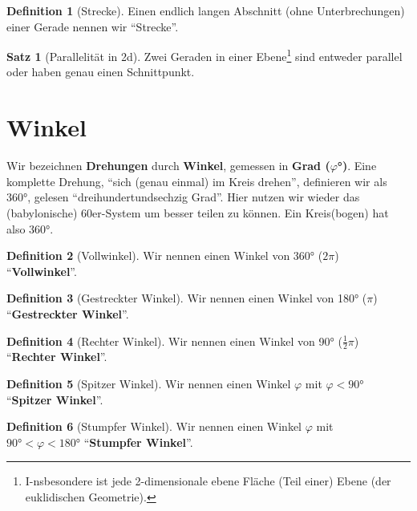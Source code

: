 \documentclass[a4paper]{book}%
\theoremstyle{definition}
\newtheorem{definition}{Definition}
\newtheorem{satz}{Satz}
\begin{document}
\begin{definition}[Strecke]\label{def:Strecke}
    Einen endlich langen Abschnitt (ohne Unterbrechungen) einer Gerade nennen wir \enquote{Strecke}.
\end{definition}

\begin{satz}[Parallelität in 2d]\label{def:Parallele}
    Zwei Geraden in einer Ebene\footnote{I-nsbesondere ist jede 2-dimensionale ebene Fläche (Teil einer) Ebene (der euklidischen Geometrie).} sind entweder parallel oder haben genau einen Schnittpunkt.
\end{satz}


\section{Winkel}\label{Winkel}

Wir bezeichnen \textbf{Drehungen} durch \textbf{Winkel}, gemessen in \textbf{Grad ($\varphi$°)}. Eine komplette Drehung, \enquote{sich (genau einmal) im Kreis drehen}, definieren wir als 360°, gelesen \enquote{dreihundertundsechzig Grad}. Hier nutzen wir wieder das (babylonische) 60er-System um besser teilen zu können. Ein Kreis(bogen) hat also 360°.

\begin{definition}[Vollwinkel]
    Wir nennen einen Winkel von 360° ($2 \pi$) \enquote{\textbf{Vollwinkel}}.
\end{definition}

\begin{definition}[Gestreckter Winkel]
    Wir nennen einen Winkel von 180° ($\pi$) \enquote{\textbf{Gestreckter Winkel}}.
\end{definition}

\begin{definition}[Rechter Winkel]
    Wir nennen einen Winkel von 90° ($\frac{1}{2} \pi$) \enquote{\textbf{Rechter Winkel}}.
\end{definition}

\begin{definition}[Spitzer Winkel]
    Wir nennen einen Winkel $\varphi$ mit $\varphi < 90°$ \enquote{\textbf{Spitzer Winkel}}.
\end{definition}

\begin{definition}[Stumpfer Winkel]
    Wir nennen einen Winkel $\varphi$ mit $90° < \varphi < 180°$ \enquote{\textbf{Stumpfer Winkel}}.
\end{definition}
\end{document}

